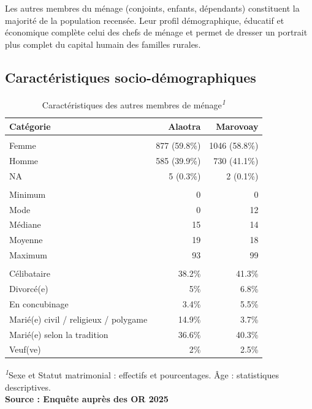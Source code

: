 \documentclass[
  french,
  letterpaper,
]{report}
\begin{document}
Les autres membres du ménage (conjoints, enfants, dépendants)
constituent la majorité de la population recensée. Leur profil
démographique, éducatif et économique complète celui des chefs de ménage
et permet de dresser un portrait plus complet du capital humain des
familles rurales.

\subsection{Caractéristiques
socio-démographiques}\label{caractuxe9ristiques-socio-duxe9mographiques-1}

\begin{table}
\caption*{
{\fontsize{20}{25}\selectfont  Caractéristiques des autres membres de ménage\textsuperscript{\textit{1}}\fontsize{12}{15}\selectfont }
} 
\fontsize{12.0pt}{14.0pt}\selectfont
\begin{tabular*}{\linewidth}{@{\extracolsep{\fill}}lrr}
\toprule
Catégorie & {\bfseries {Alaotra}} & {\bfseries {Marovoay}} \\ 
\midrule\addlinespace[2.5pt]
\multicolumn{3}{l}{{\bfseries {Sexe}}} \\[2.5pt] 
\midrule\addlinespace[2.5pt]
Femme & 877 (59.8\%) & 1046 (58.8\%) \\ 
Homme & 585 (39.9\%) & 730 (41.1\%) \\ 
NA & 5 (0.3\%) & 2 (0.1\%) \\ 
\midrule\addlinespace[2.5pt]
\multicolumn{3}{l}{{\bfseries {Âge}}} \\[2.5pt] 
\midrule\addlinespace[2.5pt]
Minimum & 0 & 0 \\ 
Mode & 0 & 12 \\ 
Médiane & 15 & 14 \\ 
Moyenne & 19 & 18 \\ 
Maximum & 93 & 99 \\ 
\midrule\addlinespace[2.5pt]
\multicolumn{3}{l}{{\bfseries {Statut matrimonial}}} \\[2.5pt] 
\midrule\addlinespace[2.5pt]
Célibataire & 38.2\% & 41.3\% \\ 
Divorcé(e) & 5\% & 6.8\% \\ 
En concubinage & 3.4\% & 5.5\% \\ 
Marié(e) civil / religieux / polygame & 14.9\% & 3.7\% \\ 
Marié(e) selon la tradition & 36.6\% & 40.3\% \\ 
Veuf(ve) & 2\% & 2.5\% \\ 
\bottomrule
\end{tabular*}
\begin{minipage}{\linewidth}
\textsuperscript{\textit{1}}Sexe et Statut matrimonial : effectifs et pourcentages. Âge : statistiques descriptives.\\
\textbf{Source : Enquête auprès des OR 2025}\\
\end{minipage}
\end{table}
\end{document}

